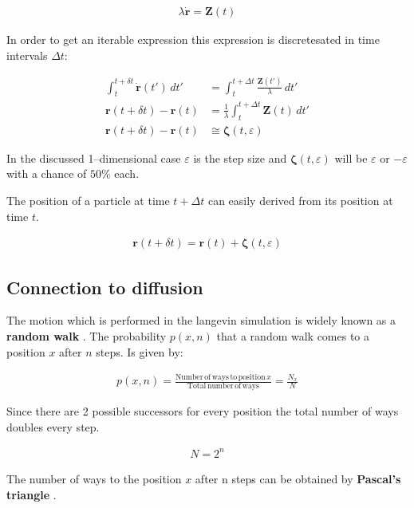 \documentclass[a4paper, parskip=half]{scrartcl}
\newcommand{\effect}[1]{%
	\textbf{#1}%
}
\begin{document}
\begin{align}
\lambda\dot{\mathbf{r}} = \mathbf{Z}(t)
\end{align}

In order to get an iterable expression this expression is discretesated in time intervals $\Delta t$:

\begin{align}
\int_t^{t+ \delta t} \dot{\mathbf{r}}(t')\, dt' &= \int_t^{t+ \Delta t} \frac{\mathbf{Z}(t')}{\lambda}\, dt' \\
\mathbf{r}(t + \delta t) - \mathbf{r}(t) &= \frac{1}{\lambda} \int_t^{t+ \Delta t} \mathbf{Z}(t)\, dt'\\
\mathbf{r}(t + \delta t) - \mathbf{r}(t) &\cong \boldsymbol{\zeta}(t, \varepsilon)
\end{align}

In the discussed 1--dimensional case $\varepsilon$ is the step size and $\boldsymbol{\zeta}(t, \varepsilon)$ will be $\varepsilon$ or $-\varepsilon$ with a chance of $50\%$ each.

The position of a particle at time $t + \Delta t$ can easily derived from its position at time $t$.

\begin{align}
\mathbf{r}(t + \delta t) = \mathbf{r}(t) + \boldsymbol{\zeta}(t, \varepsilon)
\end{align}

\subsection{Connection to diffusion}
The motion which is performed in the langevin simulation is widely known as a \effect{random walk}. The probability $p(x, n)$ that a random walk comes to a position $x$ after $n$ steps. Is given by:

\begin{align}
p(x, n) = \frac{\mathrm{Number\, of\, ways\, to\, position\,} x}{\mathrm{Total\, number\, of\, ways}} = \frac{N_x}{N}
\end{align}

Since there are 2 possible successors for every position the total number of ways  doubles every step.

\begin{align}
N = 2^n
\end{align}

The number of ways to the position $x$ after n steps can be obtained by \effect{Pascal's triangle}.
\end{document}
